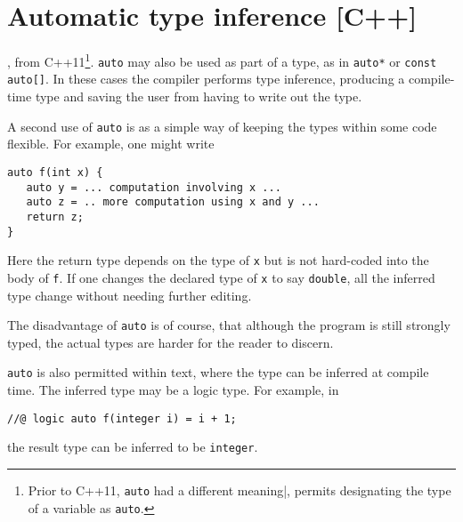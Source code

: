 \section{Automatic type inference [C++]}
\label{sec:auto}

\lang, from C++11\footnote{Prior to C++11, \lstinline|auto| had a different meaning|, permits designating the type of a variable as
\lstinline|auto|.}.
 \lstinline|auto| may also be used as part of a type, as in \lstinline|auto*| or \lstinline|const auto[]|. In these cases the compiler performs type inference, producing a compile-time type and
saving the user from having to write out the type.

A second use of \lstinline|auto| is as a simple way of keeping the types
within some code flexible. For example, one might write
\begin{lstlisting}
auto f(int x) {
   auto y = ... computation involving x ...
   auto z = .. more computation using x and y ...
   return z;
}
\end{lstlisting}
Here the return type depends on the type of \lstinline|x| but is not hard-coded into the body of \lstinline|f|. If one changes the declared type of
\lstinline|x| to say \lstinline|double|, all the inferred type change without needing further editing.

The disadvantage of \lstinline|auto| is of course, that although the 
program is still strongly typed, the actual types are harder for the reader to discern.

\lstinline|auto| is also permitted within \NAME{} text, where the type can be inferred at compile time. The inferred type may be a logic type. For example, in
\begin{lstlisting}
//@ logic auto f(integer i) = i + 1;
\end{lstlisting}
the result type can be inferred to be \lstinline|integer|.
